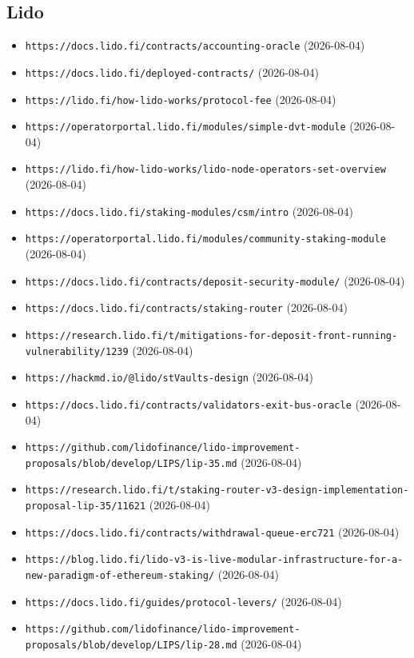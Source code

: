 \subsection*{Lido}
\begin{itemize}\setlength{\itemsep}{0pt}\small
\item \texttt{https://docs.lido.fi/contracts/accounting-oracle} (2026-08-04)
\item \texttt{https://docs.lido.fi/deployed-contracts/} (2026-08-04)
\item \texttt{https://lido.fi/how-lido-works/protocol-fee} (2026-08-04)
\item \texttt{https://operatorportal.lido.fi/modules/simple-dvt-module} (2026-08-04)
\item \texttt{https://lido.fi/how-lido-works/lido-node-operators-set-overview} (2026-08-04)
\item \texttt{https://docs.lido.fi/staking-modules/csm/intro} (2026-08-04)
\item \texttt{https://operatorportal.lido.fi/modules/community-staking-module} (2026-08-04)
\item \texttt{https://docs.lido.fi/contracts/deposit-security-module/} (2026-08-04)
\item \texttt{https://docs.lido.fi/contracts/staking-router} (2026-08-04)
\item \texttt{https://research.lido.fi/t/mitigations-for-deposit-front-running-vulnerability/1239} (2026-08-04)
\item \texttt{https://hackmd.io/@lido/stVaults-design} (2026-08-04)
\item \texttt{https://docs.lido.fi/contracts/validators-exit-bus-oracle} (2026-08-04)
\item \texttt{https://github.com/lidofinance/lido-improvement-proposals/blob/develop/LIPS/lip-35.md} (2026-08-04)
\item \texttt{https://research.lido.fi/t/staking-router-v3-design-implementation-proposal-lip-35/11621} (2026-08-04)
\item \texttt{https://docs.lido.fi/contracts/withdrawal-queue-erc721} (2026-08-04)
\item \texttt{https://blog.lido.fi/lido-v3-is-live-modular-infrastructure-for-a-new-paradigm-of-ethereum-staking/} (2026-08-04)
\item \texttt{https://docs.lido.fi/guides/protocol-levers/} (2026-08-04)
\item \texttt{https://github.com/lidofinance/lido-improvement-proposals/blob/develop/LIPS/lip-28.md} (2026-08-04)
\end{itemize}

